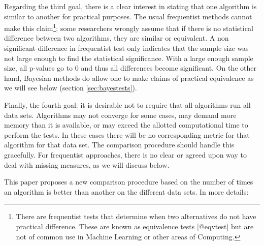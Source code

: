 \documentclass[twoside,11pt,preprint]{article}
\begin{document}
Regarding the third goal, there is a clear interest in stating that
one algorithm is similar to another for practical purposes. The usual
frequentist methods cannot make this claim\footnote{There are
frequentist tests that determine when two alternatives do not have
practical difference. These are known as equivalence tests [@eqvtest]
but are not of common use in Machine Learning or other areas of
Computing.}; some researchers wrongly assume that if there is no
statistical difference between two algorithms, they are similar or
equivalent. A non significant difference in frequentist test only
indicates that the sample size was not large enough to find the
statistical significance. With a large enough sample size, all
p-values go to 0 \citep{cosma, kruschke2015bayesian} and thus all
differences become significant. On the other hand, Bayesian methods do
allow one to make claims of practical equivalence as we will see
below (section \ref{sec:bayestests}).

Finally, the fourth goal: it is desirable not to require that all algorithms run all
data sets. Algorithms may not converge for some cases, may demand more
memory than it is available, or may exceed the allotted computational
time to perform the tests. In these cases there will be no corresponding
metric for that algorithm for that data set. The comparison procedure
should handle this gracefully. For frequentist approaches, there is
no clear or agreed upon way to deal with missing measures, as we will
discuss below.

This paper proposes a new comparison procedure based on the number of
times an algorithm is better than another on the different data sets. In more details:
\end{document}
